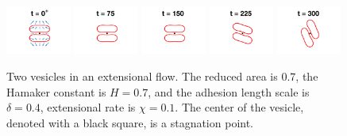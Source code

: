 \documentclass[prf,superscriptaddress,showpacs]{revtex4-1}
\begin{document}
 
\begin{figure}[htp]
  \includegraphics[width = 0.19\textwidth,trim={5cm 2cm 5cm 1cm},clip]{figs/extensional_adR4em1adS7em1Chi1em1_ra070_image01.png}
  \includegraphics[width = 0.19\textwidth,trim={5cm 2cm 5cm 1cm},clip]{figs/extensional_adR4em1adS7em1Chi1em1_ra070_image02.png}
  \includegraphics[width = 0.19\textwidth,trim={5cm 2cm 5cm 1cm},clip]{figs/extensional_adR4em1adS7em1Chi1em1_ra070_image03.png}
  \includegraphics[width = 0.19\textwidth,trim={5cm 2cm 5cm 1cm},clip]{figs/extensional_adR4em1adS7em1Chi1em1_ra070_image04.png}
  \includegraphics[width = 0.19\textwidth,trim={5cm 2cm 5cm 1cm},clip]{figs/extensional_adR4em1adS7em1Chi1em1_ra070_image05.png}
  \caption{\label{fig:extensional3} Two vesicles in an extensional flow.
  The reduced area is $0.7$, the Hamaker constant is $H = 0.7$, and the
  adhesion length scale is $\delta = 0.4$, extensional rate is $\chi =
  0.1$.  The center of the vesicle, denoted with a black square, is a
  stagnation point.}
\end{figure}
\end{document}
